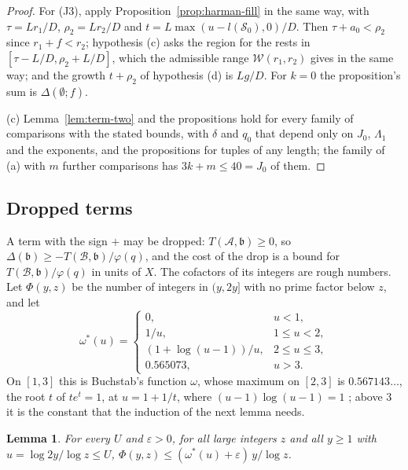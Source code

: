 \documentclass[11pt]{article}
\newtheorem{lemma}[theorem]{Lemma}
\theoremstyle{definition}
\begin{document}
\begin{proof}
For (J3), apply Proposition~\ref{prop:harman-fill} in the same way, with $\tau = Lr_1/D$, $\rho_2 = Lr_2/D$ and
$t = L\max(u - l(\mathcal S_0), 0)/D$. Then $\tau + a_0 < \rho_2$ since $r_1 + f < r_2$; hypothesis (c) asks the region
for the rests in $[\tau - L/D, \rho_2 + L/D]$, which the admissible range $\mathcal W(r_1, r_2)$ gives in the same way;
and the growth $t + \rho_2$ of hypothesis (d) is $Lg/D$. For $k =
0$ the proposition's sum is $\Delta(\emptyset; f)$.

(c) Lemma~\ref{lem:term-two} and the propositions hold for every family of comparisons with the stated bounds, with
$\delta$
and $q_0$ that depend only on $J_0$, $\Lambda_1$ and the exponents, and the propositions for tuples of any length; the
family of (a) with $m$ further comparisons has $3k + m \le 40 = J_0$ of them.
\end{proof}

\subsection{Dropped terms}\label{sec:dropped}

A term with the sign $+$ may be dropped: $T(\mathcal A, \mathfrak b) \ge 0$, so $\Delta(\mathfrak b) \ge -T(\mathcal B,
\mathfrak b)/\varphi(q)$, and the cost of the drop is a bound for $T(\mathcal B, \mathfrak b)/\varphi(q)$ in units of
$X$. The cofactors of its integers are rough numbers. Let $\Phi(y, z)$ be the number of integers in $(y, 2y]$ with no
prime factor below $z$, and let
\[
  \omega^*(u) = \begin{cases}
    0, & u < 1, \\
    1/u, & 1 \le u < 2, \\
    (1 + \log(u - 1))/u, & 2 \le u \le 3, \\
    0.565073, & u > 3.
  \end{cases}
\]
On $[1, 3]$ this is Buchstab's function $\omega$, whose maximum on $[2, 3]$ is $0.567143\ldots$, the root $t$ of
$t e^t = 1$, at $u = 1 + 1/t$, where $(u - 1)\log(u - 1) = 1$ \cite{cheer-goldston}; above $3$ it is the constant that
the induction of the next lemma needs.

\begin{lemma}\label{lem:rough}
For every $U$ and $\varepsilon > 0$, for all large integers $z$ and all $y \ge 1$ with $u = \log 2y/\log z \le U$,
$\Phi(y, z) \le (\omega^*(u) + \varepsilon)\, y/\log z$.
\end{lemma}
\end{document}
